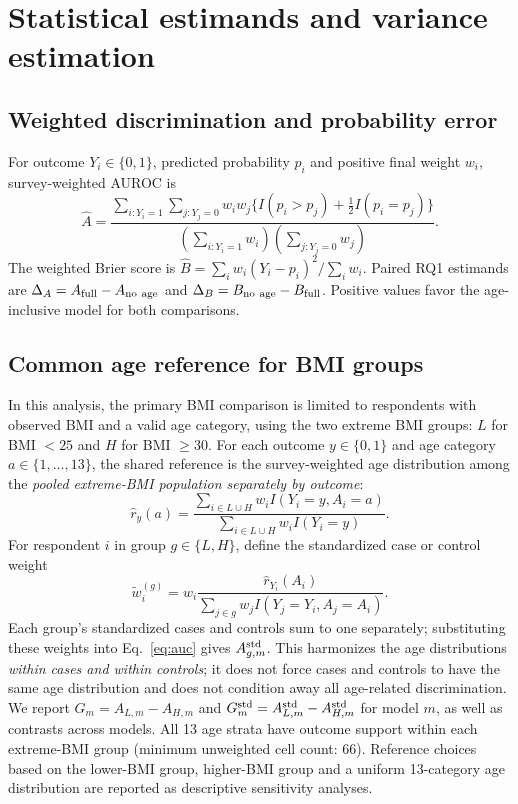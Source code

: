 \section{Statistical estimands and variance estimation}
\subsection{Weighted discrimination and probability error}
For outcome $Y_i\in\{0,1\}$, predicted probability $p_i$ and positive final weight $w_i$, survey-weighted AUROC is
\begin{equation}\label{eq:auc}
\widehat A=\frac{\sum_{i:Y_i=1}\sum_{j:Y_j=0}w_iw_j\{I(p_i>p_j)+\tfrac12 I(p_i=p_j)\}}{\left(\sum_{i:Y_i=1}w_i\right)\left(\sum_{j:Y_j=0}w_j\right)}.
\end{equation}
The weighted Brier score is $\widehat B=\sum_iw_i(Y_i-p_i)^2/\sum_iw_i$. Paired RQ1 estimands are $\Delta_A=A_{\rm full}-A_{\rm no\ age}$ and $\Delta_B=B_{\rm no\ age}-B_{\rm full}$. Positive values favor the age-inclusive model for both comparisons.

\subsection{Common age reference for BMI groups}
In this analysis, the primary BMI comparison is limited to respondents with observed BMI and a valid age category, using the two extreme BMI groups: $L$ for BMI $<25$ and $H$ for BMI $\geq 30$. For each outcome $y\in\{0,1\}$ and age category $a\in\{1,\ldots,13\}$, the shared reference is the survey-weighted age distribution among the \emph{pooled extreme-BMI population separately by outcome}:
\begin{equation}\label{eq:reference}
\widehat r_y(a)=\frac{\sum_{i\in L\cup H}w_i I(Y_i=y,A_i=a)}{\sum_{i\in L\cup H}w_i I(Y_i=y)}.
\end{equation}
For respondent $i$ in group $g\in\{L,H\}$, define the standardized case or control weight
\begin{equation}\label{eq:stdweight}
\widetilde w_i^{(g)}=w_i\frac{\widehat r_{Y_i}(A_i)}{\sum_{j\in g}w_j I(Y_j=Y_i,A_j=A_i)}.
\end{equation}
Each group's standardized cases and controls sum to one separately; substituting these weights into Eq.~\eqref{eq:auc} gives $A_{g,m}^{\rm std}$. This harmonizes the age distributions \emph{within cases and within controls}; it does not force cases and controls to have the same age distribution and does not condition away all age-related discrimination. We report $G_m=A_{L,m}-A_{H,m}$ and $G_m^{\rm std}=A_{L,m}^{\rm std}-A_{H,m}^{\rm std}$ for model $m$, as well as contrasts across models. All 13 age strata have outcome support within each extreme-BMI group (minimum unweighted cell count: 66). Reference choices based on the lower-BMI group, higher-BMI group and a uniform 13-category age distribution are reported as descriptive sensitivity analyses.

